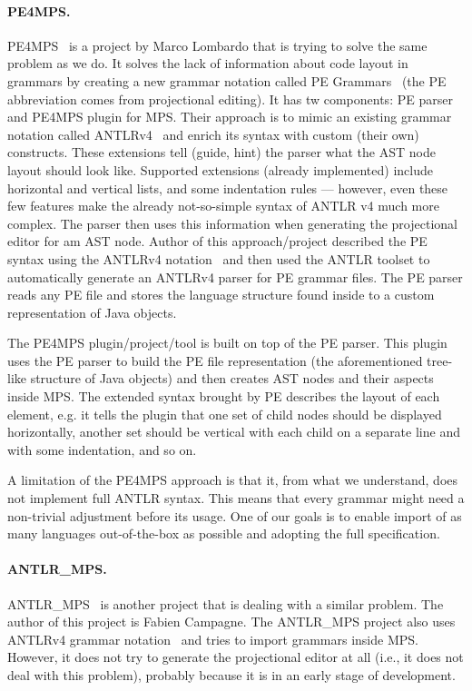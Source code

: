 \paragraph{PE4MPS.}
PE4MPS~\cite{ref:PE4MPS} is a project by Marco Lombardo that is trying to solve the same problem as we do.
It solves the lack of information about code layout in grammars by creating a new grammar notation called PE Grammars~\cite{ref:PE} (the PE abbreviation comes from projectional editing).
It has tw components: PE parser and PE4MPS plugin for MPS.
Their approach is to mimic an existing grammar notation called ANTLRv4~\cite{ANTLR4} and enrich its syntax with custom (their own) constructs.
These extensions tell (guide, hint) the parser what the AST node layout should look like.
Supported extensions (already implemented) include horizontal and vertical lists, and some indentation rules --- however, even these few features make the already not-so-simple syntax of ANTLR v4 much more complex.
The parser then uses this information when generating the projectional editor for am AST node.
Author of this approach/project described the PE syntax using the ANTLRv4 notation~\cite{ANTLR4reference} and then used the ANTLR toolset to automatically generate an ANTLRv4 parser for PE grammar files.
The PE parser reads any PE file and stores the language structure found inside to a custom representation of Java objects.

The PE4MPS plugin/project/tool is built on top of the PE parser.
This plugin uses the PE parser to build the PE file representation (the aforementioned tree-like structure of Java objects) and then creates AST nodes and their aspects inside MPS.
The extended syntax brought by PE describes the layout of each element, e.g. it tells the plugin that one set of child nodes should be displayed horizontally, another set should be vertical with each child on a separate line and with some indentation, and so on.

A limitation of the PE4MPS approach is that it, from what we understand, does not implement full ANTLR syntax.
This means that every grammar might need a non-trivial adjustment before its usage.
One of our goals is to enable import of as many languages out-of-the-box as possible and adopting the full specification.

\paragraph{ANTLR{\_}MPS.}
ANTLR{\_}MPS~\cite{ANTLR2MPS} is another project that is dealing with a similar problem.
The author of this project is Fabien Campagne.
The ANTLR{\_}MPS project also uses ANTLRv4 grammar notation~\cite{ANTLR4} and tries to import grammars inside MPS.
However, it does not try to generate the projectional editor at all (i.e., it does not deal with this problem), probably because it is in an early stage of development.


